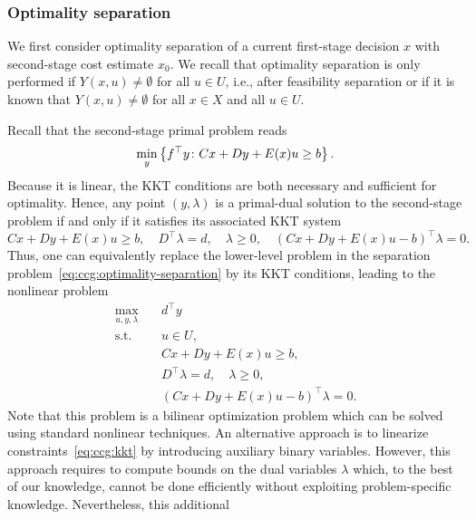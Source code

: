 \subsubsection{Optimality separation}

We first consider optimality separation of a current first-stage decision $x$
with second-stage cost estimate $x_0$. We recall that optimality separation is
only performed if $Y(x,u) \neq \emptyset$ for all $u\in U$, i.e., after
feasibility separation or if it is known that $Y(x,u) \neq\emptyset$ for all
$x\in X$ and all $u\in U$. 


Recall that the second-stage primal problem reads
\begin{equation*}
    \min_y\left\{ f^\top y \colon Cx + Dy + E(x)u \ge b \right\}.
\end{equation*}
Because it is linear, the KKT conditions are both necessary and sufficient for
optimality. Hence, any point $(y,\lambda)$ is a primal-dual solution to the
second-stage problem if and only if it satisfies its associated KKT system
\begin{equation*}
    Cx + Dy + E(x)u \ge b, \quad 
    D^\top \lambda = d, \quad 
    \lambda\ge 0, \quad
    (Cx + Dy + E(x)u - b)^\top \lambda = 0.
\end{equation*}
Thus, one can equivalently replace the lower-level problem in the separation
problem~\eqref{eq:ccg:optimality-separation} by its KKT conditions, leading to
the nonlinear problem
\begin{subequations}
    \begin{align}
        \max_{u,y,\lambda} \quad & d^\top y \\
        \text{s.t.} \quad & u\in U, \\
        & Cx + Dy + E(x)u \ge b, \\ 
        & D^\top \lambda = d, \quad \lambda\ge 0, \\
        & (Cx + Dy + E(x)u - b)^\top \lambda = 0. \label{eq:ccg:kkt}
    \end{align}
\end{subequations}
Note that this problem is a bilinear optimization problem which can be solved
using standard nonlinear techniques. An alternative approach is to linearize
constraints~\eqref{eq:ccg:kkt} by introducing auxiliary binary variables.
However, this approach requires to compute bounds on the dual variables
$\lambda$ which, to the best of our knowledge, cannot be done efficiently
without exploiting problem-specific knowledge. Nevertheless, this additional

